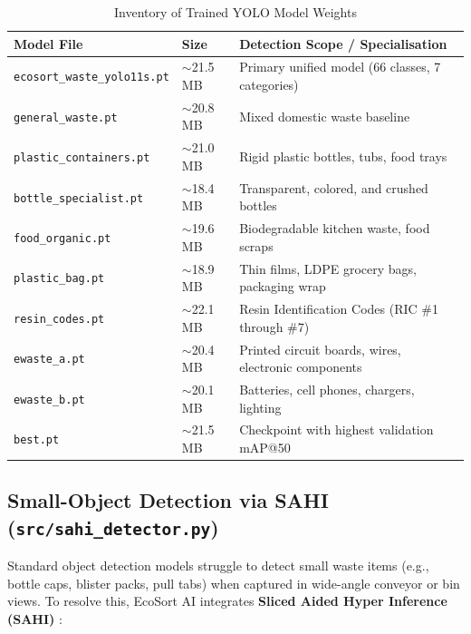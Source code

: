 \documentclass[12pt,a4paper]{article}
\begin{document}
\begin{table}[H]
\centering
\caption{Inventory of Trained YOLO Model Weights}\label{tab:models}
\begin{tabular}{lll}
\toprule
\textbf{Model File} & \textbf{Size} & \textbf{Detection Scope / Specialisation} \\
\midrule
\texttt{ecosort\_waste\_yolo11s.pt} & $\sim$21.5\,MB & Primary unified model (66 classes, 7 categories) \\
\texttt{general\_waste.pt}          & $\sim$20.8\,MB & Mixed domestic waste baseline \\
\texttt{plastic\_containers.pt}     & $\sim$21.0\,MB & Rigid plastic bottles, tubs, food trays \\
\texttt{bottle\_specialist.pt}      & $\sim$18.4\,MB & Transparent, colored, and crushed bottles \\
\texttt{food\_organic.pt}           & $\sim$19.6\,MB & Biodegradable kitchen waste, food scraps \\
\texttt{plastic\_bag.pt}            & $\sim$18.9\,MB & Thin films, LDPE grocery bags, packaging wrap \\
\texttt{resin\_codes.pt}            & $\sim$22.1\,MB & Resin Identification Codes (RIC \#1 through \#7) \\
\texttt{ewaste\_a.pt}               & $\sim$20.4\,MB & Printed circuit boards, wires, electronic components \\
\texttt{ewaste\_b.pt}               & $\sim$20.1\,MB & Batteries, cell phones, chargers, lighting \\
\texttt{best.pt}                    & $\sim$21.5\,MB & Checkpoint with highest validation mAP@50 \\
\bottomrule
\end{tabular}
\end{table}

\subsection{Small-Object Detection via SAHI (\texttt{src/sahi\_detector.py})}

Standard object detection models struggle to detect small waste items (e.g., bottle caps,
blister packs, pull tabs) when captured in wide-angle conveyor or bin views. To resolve this,
EcoSort AI integrates \textbf{Sliced Aided Hyper Inference (SAHI)} \cite{akyon2022sahi}:
\end{document}
